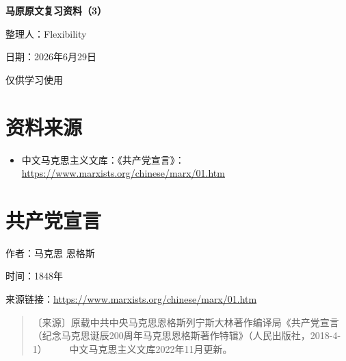 \documentclass[UTF8,zihao=-4,a4paper]{ctexart}
\begin{document}
\begin{titlepage}
\thispagestyle{empty}
\centering
\vspace*{0.22\textheight}
{\bfseries 马原原文复习资料（3）\par}
\vspace{3.5cm}
{ 整理人：Flexibility\par}
\vspace{1.2cm}
{ 日期：2026年6月29日\par}
\vfill
{ 仅供学习使用\par}
\end{titlepage}
\setcounter{page}{1}
\tableofcontents
\newpage
\section*{资料来源}
\begin{itemize}
\item 中文马克思主义文库：《共产党宣言》：\url{https://www.marxists.org/chinese/marx/01.htm}
\end{itemize}
\newpage
\section*{共产党宣言}
作者：马克思 恩格斯\par
时间：1848年\par
来源链接：\url{https://www.marxists.org/chinese/marx/01.htm}\par
\begin{quote}
〔来源〕原载中共中央马克思恩格斯列宁斯大林著作编译局《共产党宣言（纪念马克思诞辰200周年马克思恩格斯著作特辑》（人民出版社，2018-4-1） 
 　　中文马克思主义文库2022年11月更新。\par
\end{quote}
\end{document}
